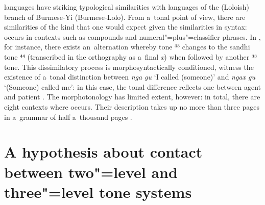  languages have striking typological similarities with languages of the  (Loloish) branch of {Burmese}-{Yi} ({Burmese}-Lolo). From a~tonal point of view, there are similarities of the kind that one would expect given the similarities in syntax:  occurs in contexts such as compounds and numeral"=plus"=classifier phrases. In , for instance, there exists an~alternation whereby tone ³³ changes to the sandhi tone ⁴⁴ (transcribed in the orthography as a~final \textit{x}) when followed by another ³³ tone. This dissimilatory process is morphosyntactically conditioned, witness the existence of a~tonal distinction between \textit{nga gu} ‘I called (someone)’ and \textit{ngax gu} ‘(Someone) called me’: in this case, the tonal difference reflects one between {agent} and {patient} \citep[28]{gerner2013}. The morphotonology has limited extent, however: in total, there are eight contexts where  occurs. Their description takes up no more than three pages in a~grammar of half a~thousand pages \citep[28--30]{gerner2013}.

\section[Contact between two"=level and three"=level tone systems]{A hypothesis about contact between two"=level and three"=level tone systems}
\label{sec:twolevelsthreelevels}

